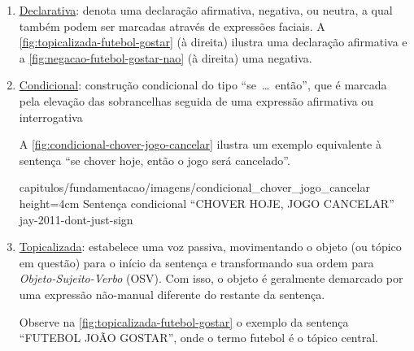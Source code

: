 \begin{enumerate}
\begin{enumerate}
                    {capitulos/fundamentacao/imagens/interrogativa_joao_gostar} %
                    {height=3cm} %
                    {Sentença interrogativa ``JOÃO GOSTAR QUEM?''} %
                    {quadros-2004-estudos-linguisticos} %


              \item \underline{Declarativa}: denota uma declaração afirmativa, negativa, ou neutra, a qual também podem ser marcadas através de expressões faciais.
                    A \autoref{fig:topicalizada-futebol-gostar} (à direita) ilustra uma declaração afirmativa e a \autoref{fig:negacao-futebol-gostar-nao} (à direita) uma negativa.



              \item \underline{Condicional}: construção condicional do tipo ``se~\dots~então'', que é marcada pela elevação das sobrancelhas seguida de uma expressão afirmativa ou interrogativa

                    A \autoref{fig:condicional-chover-jogo-cancelar} ilustra um exemplo equivalente à sentença ``se chover hoje, então o jogo será cancelado''.

                    {capitulos/fundamentacao/imagens/condicional_chover_jogo_cancelar} %
                    {height=4cm} %
                    {Sentença condicional ``CHOVER HOJE, JOGO CANCELAR''} %
                    {jay-2011-dont-just-sign} %


              \item \underline{Topicalizada}: estabelece uma voz passiva, movimentando o objeto (ou tópico em questão) para o início da sentença e transformando sua ordem para \textit{Objeto-Sujeito-Verbo} (OSV). Com isso, o objeto é geralmente demarcado por uma expressão não-manual diferente do restante da sentença.

                    Observe na \autoref{fig:topicalizada-futebol-gostar} o exemplo da sentença ``FUTEBOL JOÃO GOSTAR'', onde o termo futebol é o tópico central.



\end{enumerate}
\end{enumerate}
